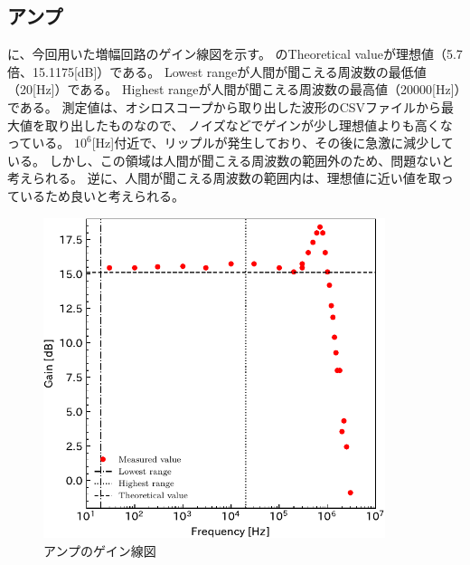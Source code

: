 \documentclass[report.tex]{subfiles}
\begin{document}
\subsection{アンプ}

に、今回用いた増幅回路のゲイン線図を示す。
のTheoretical valueが理想値（5.7倍、15.1175[dB]）である。
Lowest rangeが人間が聞こえる周波数の最低値（20[Hz]）である。
Highest rangeが人間が聞こえる周波数の最高値（20000[Hz]）である。
測定値は、オシロスコープから取り出した波形のCSVファイルから最大値を取り出したものなので、
ノイズなどでゲインが少し理想値よりも高くなっている。
\(10^6\)[Hz]付近で、リップルが発生しており、その後に急激に減少している。
しかし、この領域は人間が聞こえる周波数の範囲外のため、問題ないと考えられる。
逆に、人間が聞こえる周波数の範囲内は、理想値に近い値を取っているため良いと考えられる。

\begin{figure}[H]
	\centering
	\includegraphics[width=10cm]{fig/gain.pdf}
	\caption{アンプのゲイン線図}
	\label{fig:gain}
\end{figure}
\end{document}
